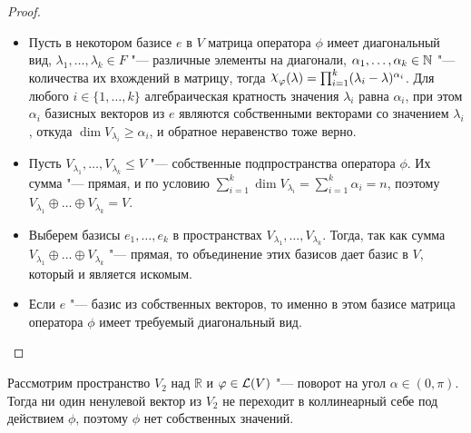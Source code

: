 \begin{proof}~
	\begin{itemize}
		\item{}Пусть в некотором базисе $e$ в $V$ матрица оператора $\phi$ имеет диагональный вид, $\lambda_1, \dotsc, \lambda_k \in F$ "--- различные элементы на диагонали, $\alpha_1, \dotsc, \alpha_k \in \mathbb{N}$ "--- количества их вхождений в матрицу, тогда $\Chi_\phi(\lambda) = \prod_{i = 1}^k(\lambda_i - \lambda)^{\alpha_i}$. Для любого $i \in \{1, \dotsc, k\}$ алгебраическая кратность значения $\lambda_i$ равна $\alpha_i$, при этом $\alpha_i$ базисных векторов из $e$ являются собственными векторами со значением $\lambda_i$, откуда $\dim{V_{\lambda_i}} \ge \alpha_i$, и обратное неравенство тоже верно.
		
		\item{}Пусть $V_{\lambda_1}, \dotsc, V_{\lambda_k} \le V$ "--- собственные подпространства оператора $\phi$. Их сумма "--- прямая, и по условию $\sum_{i = 1}^k\dim{V_{\lambda_i}} = \sum_{i = 1}^k\alpha_i = n$, поэтому $V_{\lambda_1} \oplus \dots \oplus V_{\lambda_k} = V$.
		
		\item{}Выберем базисы $e_1, \dotsc, e_k$ в пространствах $V_{\lambda_1}, \dotsc, V_{\lambda_k}$. Тогда, так как сумма $V_{\lambda_1} \oplus \dots \oplus V_{\lambda_k}$ "--- прямая, то объединение этих базисов дает базис в $V$, который и является искомым.
		
		\item{}Если $e$ "--- базис из собственных векторов, то именно в этом базисе матрица оператора $\phi$ имеет требуемый диагональный вид.\qedhere
	\end{itemize}
\end{proof}

\begin{note}
	Рассмотрим пространство $V_2$ над $\mathbb{R}$ и $\varphi \in \mathcal L(V)$ "--- поворот на угол $\alpha \in (0, \pi)$. Тогда ни один ненулевой вектор из $V_2$ не переходит в коллинеарный себе под действием $\phi$, поэтому $\phi$ нет собственных значений.
\end{note}